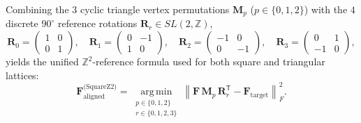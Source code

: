 \documentclass[11pt,a4paper]{article}
\newcommand{\Z}{\mathbb{Z}}
\newcommand{\T}{^{\mathsf T}}
\begin{document}
Combining the $3$ cyclic triangle vertex permutations $\mathbf{M}_p$ ($p \in \{0,1,2\}$) with the $4$ discrete $90^\circ$ reference rotations $\mathbf{R}_r \in SL(2,\Z)$,
\begin{equation}
  \mathbf{R}_0 = \begin{pmatrix} 1 & 0 \\ 0 & 1 \end{pmatrix}, \quad
  \mathbf{R}_1 = \begin{pmatrix} 0 & -1 \\ 1 & 0 \end{pmatrix}, \quad
  \mathbf{R}_2 = \begin{pmatrix} -1 & 0 \\ 0 & -1 \end{pmatrix}, \quad
  \mathbf{R}_3 = \begin{pmatrix} 0 & 1 \\ -1 & 0 \end{pmatrix},
\end{equation}
yields the unified $\Z^2$-reference formula used for both square and triangular lattices:
\begin{equation}
  \boxed{
  \mathbf{F}_{\text{aligned}}^{\text{(SquareZ2)}} = \operatorname*{arg\,min}_{\substack{p \in \{0,1,2\} \\ r \in \{0,1,2,3\}}}
  \left\| \mathbf{F}\,\mathbf{M}_p\,\mathbf{R}_r\T - \mathbf{F}_{\text{target}} \right\|_F^2.
  }
  \label{eq:f_aligned_sq}
\end{equation}
\end{document}
